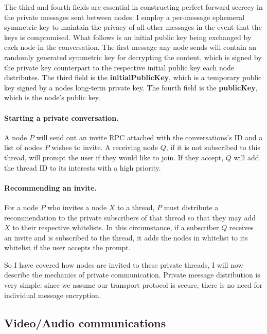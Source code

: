 \documentclass[10pt,a4paper,onecolumn]{article}
\begin{document}
The third and fourth fields are essential in constructing perfect forward secrecy in the private messages sent between nodes. I employ a per-message ephemeral symmetric key to maintain the privacy of all other messages in the event that the keys is compromised. What follows is an initial public key being exchanged by each node in the conversation. The first message any node sends will contain an randomly generated symmetric key for decrypting the content, which is signed by the private key counterpart to the respective initial public key each node distributes. The third field is the \textbf{initialPublicKey}, which is a temporary public key signed by a nodes long-term private key. The fourth field is the \textbf{publicKey}, which is the node's public key.

\paragraph*{Starting a private conversation.} A node $P$ will send out an invite RPC attached with the conversations's ID and a list of nodes $P$ wishes to invite. A receiving node $Q$, if it is not subscribed to this thread, will prompt the user if they would like to join. If they accept, $Q$ will add the thread ID to its interests with a high priority. 

\paragraph*{Recommending an invite.} For a node $P$ who invites a node $X$ to a thread, $P$ must distribute a recommendation to the private subscribers of that thread so that they may add $X$ to their respective whitelists. In this circumstance, if a subscriber $Q$ receives an invite and is subscribed to the thread, it adds the nodes in whitelist to its whitelist if the user accepts the prompt.

So I have covered how nodes are invited to these private threads, I will now describe the mechanics of private communication. Private message distribution is very simple: since we assume our transport protocol is secure, there is no need for individual message encryption. 

\subsection*{Video/Audio communications}

\end{document}
